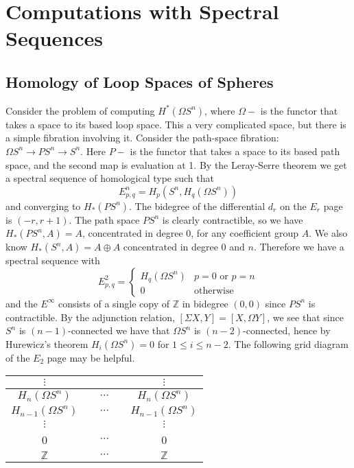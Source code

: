 \section{Computations with Spectral Sequences}


\subsection{Homology of Loop Spaces of Spheres}

Consider the problem of computing $H^*(\Omega S^n)$, where $\Omega -$ is the functor that takes a space to its based loop space. This a very complicated space, but there is a simple fibration involving it. Consider the path-space fibration: $\Omega S^n \rightarrow PS^n \rightarrow S^n$. Here $P-$ is the functor that takes a space to its based path space, and the second map is evaluation at 1. By the Leray-Serre theorem we get a spectral sequence of homological type such that 
\[ E_{p,q}^n = H_p(S^n, H_q(\Omega S^n)) \]
and converging to $H_*(PS^n)$. The bidegree of the differential $d_r$ on the $E_r$ page is $(-r,r+1)$. The path space $PS^n$ is clearly contractible, so we have $H_*(PS^n,A) = A$, concentrated in degree 0, for any coefficient group $A$. We also know $H_*(S^n,A) = A \oplus A$ concentrated in degree 0 and $n$. Therefore we have a spectral sequence with 
\[ E_{p,q}^2 = \begin{cases} H_q(\Omega S^n) & p=0 \text{ or } p=n \\ 0 & \text{otherwise} \end{cases} \]
and the $E^\infty$ consists of a single copy of $\mathbb Z$ in bidegree $(0,0)$ since $PS^n$ is contractible. By the adjunction relation, $[\Sigma X,Y] = [X, \Omega Y]$, we see that since $S^n$ is $(n-1)$-connected we have that $\Omega S^n$ is $(n-2)$-connected, hence by Hurewicz's theorem $H_i(\Omega S^n)=0$ for $1 \leq i \leq n-2$. The following grid diagram of the $E_2$ page may be helpful.
\begin{table}[h]
\centering
\begin{tabular}{|c|c|c|c|c|}
	\hline
	$\vdots$ & & & & $\vdots$ \\
	\hline
	$H_n(\Omega S^n)$ & & $\cdots$ & & $H_n(\Omega S^n)$ \\
	\hline
	$H_{n-1}(\Omega S^n)$ & & $\cdots$ & & $H_{n-1}(\Omega S^n)$ \\
	\hline
	$\vdots$ & & & & $\vdots$ \\
	\hline
	0 & & $\cdots$ & & 0 \\
	\hline
	$\mathbb Z$ & & $\cdots$ & & $\mathbb Z$ \\
	\hline
\end{tabular}
\end{table}
